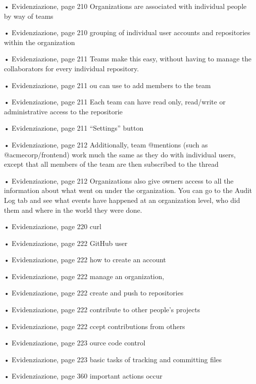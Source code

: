 • Evidenziazione, page 210
Organizations are associated with individual people by way of teams

• Evidenziazione, page 210
grouping of individual user accounts and repositories within the organization

• Evidenziazione, page 211
Teams make this easy, without having to manage the collaborators for every individual repository.

• Evidenziazione, page 211
ou can use to add members to the team

• Evidenziazione, page 211
Each team can have read only, read/write or administrative access to the repositorie

• Evidenziazione, page 211
“Settings” button

• Evidenziazione, page 212
Additionally, team @mentions (such as @acmecorp/frontend) work much the same as they do with individual users, except that all members of the team are then subscribed to the thread

• Evidenziazione, page 212
Organizations also give owners access to all the information about what went on under the organization. You can go to the Audit Log tab and see what events have happened at an organization level, who did them and where in the world they were done.

• Evidenziazione, page 220
curl

• Evidenziazione, page 222
GitHub user

• Evidenziazione, page 222
how to create an account

• Evidenziazione, page 222
manage an organization,

• Evidenziazione, page 222
create and push to repositories

• Evidenziazione, page 222
contribute to other people’s projects

• Evidenziazione, page 222
ccept contributions from others

• Evidenziazione, page 223
ource code control

• Evidenziazione, page 223
basic tasks of tracking and committing files

• Evidenziazione, page 360
important actions occur